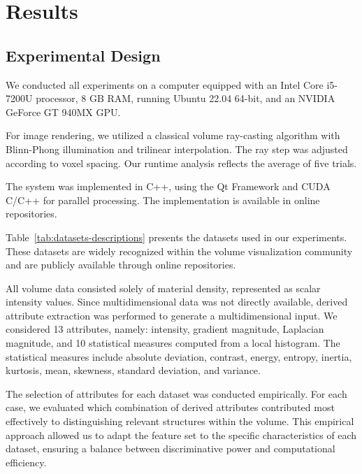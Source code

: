 \section{Results}
\label{sect:results}
\subsection{Experimental Design}
\label{subsect:experimental-design}

We conducted all experiments on a computer equipped with an Intel Core i5-7200U processor, 8 GB RAM, running Ubuntu 22.04 64-bit, and an NVIDIA GeForce GT 940MX GPU.

For image rendering, we utilized a classical volume ray-casting algorithm with Blinn-Phong illumination and trilinear interpolation. The ray step was adjusted according to voxel spacing. Our runtime analysis reflects the average of five trials.

The system was implemented in C++, using the Qt Framework and CUDA C/C++ for parallel processing. The implementation is available in online repositories.

Table~\ref{tab:datasets-descriptions} presents the datasets used in our experiments. These datasets are widely recognized within the volume visualization community and are publicly available through online repositories.

All volume data consisted solely of material density, represented as scalar intensity values. Since multidimensional data was not directly available, derived attribute extraction was performed to generate a multidimensional input. We considered 13 attributes, namely: intensity, gradient magnitude, Laplacian magnitude, and 10 statistical measures computed from a local histogram. The statistical measures include absolute deviation, contrast, energy, entropy, inertia, kurtosis, mean, skewness, standard deviation, and variance.


The selection of attributes for each dataset was conducted empirically. For each case, we evaluated which combination of derived attributes contributed most effectively to distinguishing relevant structures within the volume. This empirical approach allowed us to adapt the feature set to the specific characteristics of each dataset, ensuring a balance between discriminative power and computational efficiency.



